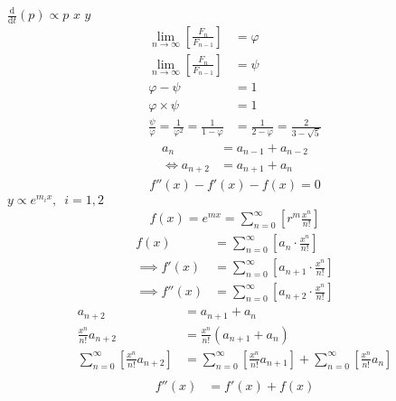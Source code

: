 \documentclass{article}
\begin{document}
$\frac{\mathrm{d} }{\mathrm{d} t}\left( p \right)
\propto p$
$x$
$y$
$$\begin{aligned}
\lim_{n     \rightarrow \infty }\left[ \frac{F_n}{F_{n- 1} }  \right] &= \varphi \\
\lim_{n     \rightarrow \infty }\left[ \frac{F_n}{F_{n- 1} }  \right] &= \psi \\
\varphi - \psi &=  1 \\
\varphi \times  \psi  &= 1 \\
\frac{\psi}{\varphi}  = \frac{1}{\varphi^2} = \frac{1}{1-\varphi} &= \frac{1}{2-\varphi} = \frac{2}{3 - \sqrt{5}  }
\end{aligned}$$
\begin{align}
    a_{n}&= a_{n - 1} + a_{n - 2} \nonumber \\
\iff a_{n+  2} &= a_{n+  1} +  a_n \label{eq:fib-def-shift}
\end{align}
\begin{align*}
f''\left( x \right)- f'\left( x \right)- f\left( x \right)=  0
\end{align*}
$y \propto e^{m_{i}x}, \enspace i = 1, 2$
\begin{align*}
f\left( x \right)= e^{mx} = \sum^{\infty}_{n= 0}   \left[ r^{m} \frac{x^n}{n!} \right]
\end{align*}
\begin{align}
    f\left( x \right) &=  \sum^{\infty}_{n= 0}   \left[ a_{n} \cdot  \frac{x^n}{n!} \right]   \label{eq:exp-gen-def-1} \\
 \implies   f'\left( x \right) &=  \sum^{\infty}_{n= 0}   \left[ a_{n+1} \cdot  \frac{x^n}{n!} \right]   \label{eq:exp-gen-def-2} \\
\implies    f''\left( x \right) &=  \sum^{\infty}_{n= 0}   \left[ a_{n+2} \cdot  \frac{x^n}{n!} \right]   \label{eq:exp-gen-def-3}
\end{align}
\begin{align*}
a_{n+  2}    &= a_{n+  1} +  a_{n}\\
\frac{x^n}{n!}   a_{n+  2}    &= \frac{x^n}{n!}\left( a_{n+  1} +  a_{n}  \right)\\
\sum^{\infty}_{n= 0} \left[ \frac{x^n}{n!}   a_{n+  2} \right]        &= \sum^{\infty}_{n= 0}   \left[ \frac{x^n}{n!} a_{n+  1} \right]  + \sum^{\infty}_{n= 0}   \left[ \frac{x^n}{n!} a_{n}  \right]  \\
\end{align*}
\begin{align}
f''\left( x \right) &= f'\left( x \right)+  f\left( x \right)
\end{align}
\end{document}
